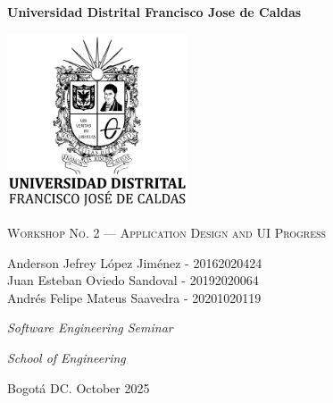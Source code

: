 \begin{titlepage}
	\centering
	{\bfseries\LARGE Universidad Distrital Francisco Jose de Caldas\par}
	{\includegraphics[width=0.4\textwidth]{Portada/logo}\par}
	\vfill
	{\scshape\Huge Workshop No. 2 — Application Design and UI Progress \par}
	\vfill
	{\Large Anderson Jefrey López Jiménez - 20162020424 \\
Juan Esteban Oviedo Sandoval - 20192020064 \\
Andrés Felipe Mateus Saavedra - 20201020119 \par}
	\vfill
	\vfill
	{\itshape\Large Software Engineering Seminar \par}
	{\itshape\Large School of Engineering \par}
	{\Large Bogotá DC. October 2025 \par}
\end{titlepage}

